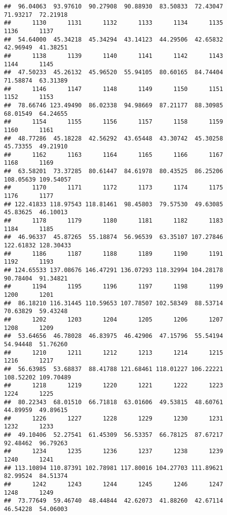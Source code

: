 \documentclass[
]{article}
\begin{document}
\begin{verbatim}
##  96.04063  93.97610  90.27908  90.88930  83.50833  72.43047  71.93217  72.21918 
##      1130      1131      1132      1133      1134      1135      1136      1137 
##  54.64000  45.34218  45.34294  43.14123  44.29506  42.65832  42.96949  41.38251 
##      1138      1139      1140      1141      1142      1143      1144      1145 
##  47.50233  45.26132  45.96520  55.94105  80.60165  84.74404  71.58874  63.31389 
##      1146      1147      1148      1149      1150      1151      1152      1153 
##  78.66746 123.49490  86.02338  94.98669  87.21177  88.30985  68.01549  64.24655 
##      1154      1155      1156      1157      1158      1159      1160      1161 
##  48.77286  45.18228  42.56292  43.65448  43.30742  45.30258  45.73355  49.21910 
##      1162      1163      1164      1165      1166      1167      1168      1169 
##  63.58201  73.37285  80.61447  84.61978  80.43525  86.25206 108.05639 109.54057 
##      1170      1171      1172      1173      1174      1175      1176      1177 
## 122.41833 118.97543 118.81461  98.45803  79.57530  49.63085  45.83625  46.10013 
##      1178      1179      1180      1181      1182      1183      1184      1185 
##  46.96337  45.87265  55.18874  56.96539  63.35107 107.27846 122.61832 128.30433 
##      1186      1187      1188      1189      1190      1191      1192      1193 
## 124.65533 137.08676 146.47291 136.07293 118.32994 104.28178  90.78404  91.34821 
##      1194      1195      1196      1197      1198      1199      1200      1201 
##  86.18210 116.31445 110.59653 107.78507 102.58349  88.53714  70.63829  59.43248 
##      1202      1203      1204      1205      1206      1207      1208      1209 
##  53.64656  46.78028  46.83975  46.42906  47.15796  55.54194  54.94448  51.76260 
##      1210      1211      1212      1213      1214      1215      1216      1217 
##  56.63985  53.68837  88.41788 121.68461 118.01227 106.22221 108.52202 109.70489 
##      1218      1219      1220      1221      1222      1223      1224      1225 
##  80.22343  68.01510  66.71818  63.01606  49.53815  48.60761  44.89959  49.89615 
##      1226      1227      1228      1229      1230      1231      1232      1233 
##  49.10406  52.27541  61.45309  56.53357  66.78125  87.67217  92.48462  96.79263 
##      1234      1235      1236      1237      1238      1239      1240      1241 
## 113.10894 110.87391 102.78981 117.80016 104.27703 111.89621  82.99524  84.51374 
##      1242      1243      1244      1245      1246      1247      1248      1249 
##  73.77649  59.46740  48.44844  42.62073  41.88260  42.67114  46.54228  54.06003 

\end{verbatim}
\end{document}
